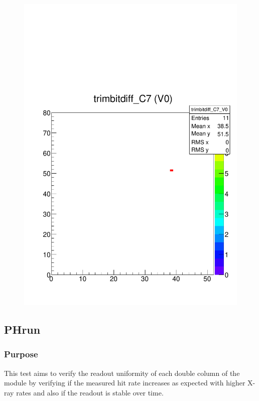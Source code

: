 \documentclass[a4paper,12pt,twoside]{article}
\begin{document}
\begin{figure}
\begin{minipage}{.48\textwidth}
  \centering
  \includegraphics[width=\textwidth]{./Figures/RetrimHotPixels_TrimBitDiff.pdf}
  \label{RetrimHotPixels-TrimbitHitmap}
\end{minipage}
\end{figure}

\subsection{PHrun}
\subsubsection{Purpose}
This test aims to verify the readout uniformity of each double column of the module by verifying if the measured hit rate increases as expected with higher X-ray rates and also if the readout is stable over time.
\end{document}
